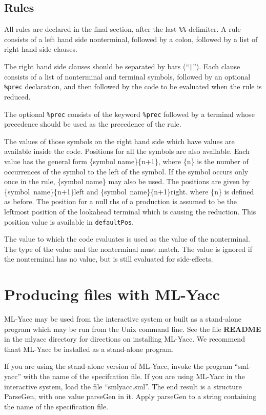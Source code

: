 \subsection{Rules}

All rules are declared in the final section, after the last {\tt \%\%}
delimiter.  A rule consists of a left hand side nonterminal, followed by
a colon, followed by a list of right hand side clauses. 

The right hand side clauses should be separated by bars (``{\tt |}'').  Each
clause consists of a list of nonterminal and terminal symbols, followed
by an optional {\tt \%prec} declaration, and then followed by the code to be
evaluated when the rule is reduced.

The optional {\tt \%prec} consists of the keyword {\tt \%prec} followed by a 
terminal whose precedence should be used as the precedence of the
rule.

The values of those symbols on the right hand side which have values are 
available inside the code.  Positions for all the symbols are also
available.
Each value has the general form \{symbol name\}\{n+1\}, where \{n\} is the 
number of occurrences of the symbol to the left of the symbol.  If
the symbol occurs only once in the rule, \{symbol name\} may also 
be used.
The positions are given by \{symbol~name\}\{n+1\}left and
\{symbol~name\}\{n+1\}right.  where \{n\} is defined as before.
The position for a null rhs of
a production is assumed to be the leftmost position of the lookahead
terminal which is causing the reduction. This position value is
available in {\tt defaultPos}.

The value to which the code evaluates is used as the value of the
nonterminal.  The type of the value and the nonterminal must match.
The value is ignored if the nonterminal has no value, but is still
evaluated for side-effects.

\section{Producing files with ML-Yacc}

ML-Yacc may be used from the interactive system or built as a
stand-alone program which may be run from the Unix command line.
See the file {\bf README} in the mlyacc directory for directions
on installing ML-Yacc.  We recommend thaat ML-Yacc be installed as
a stand-alone program.

If you are using the stand-alone version of ML-Yacc, invoke the
program ``sml-yacc'' with the name of the specifcation file.
If you are using  ML-Yacc in the interactive system, load the file
``smlyacc.sml''.  The end result is a structure ParseGen, with one
value parseGen in it.  Apply parseGen to a string containing the
name of the specification file.

